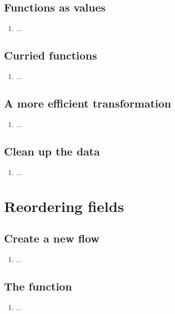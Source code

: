 \subsection{Functions as values}
\begin{enumerate}[resume*]
\item ...
\end{enumerate}

\subsection{Curried functions}
\begin{enumerate}[resume*]
\item ...
\end{enumerate}

\subsection{A more efficient transformation}
\begin{enumerate}[resume*]
\item ...
\end{enumerate}

\subsection{Clean up the data}
\begin{enumerate}[resume*]
\item ...
\end{enumerate}

\section{Reordering fields}

\subsection{Create a new flow}
\begin{enumerate}
\item ...
\end{enumerate}

\subsection{The  function}
\begin{enumerate}[resume*]
\item ...
\end{enumerate}

